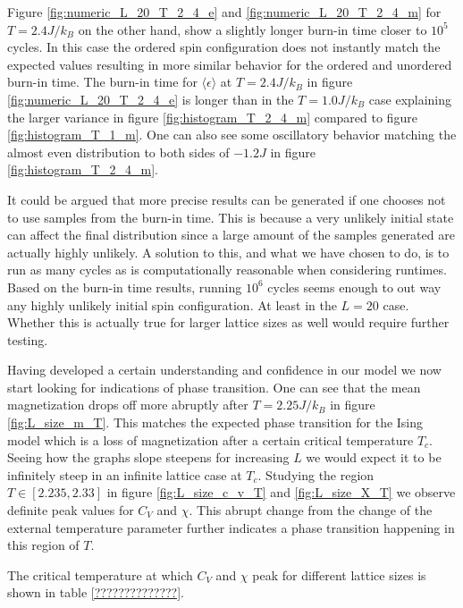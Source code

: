 \documentclass[english,notitlepage,reprint,nofootinbib]{revtex4-1}  %
\begin{document}
Figure \ref{fig:numeric_L_20_T_2_4_e} and \ref{fig:numeric_L_20_T_2_4_m} for $T=2.4 J/k_B$ on the other hand, show a slightly longer burn-in time closer to $10^5$ cycles. In this case the ordered spin configuration does not instantly match the expected values resulting in more similar behavior for the ordered and unordered burn-in time. The burn-in time for $\langle \epsilon \rangle$ at $T=2.4J/k_B$ in figure \ref{fig:numeric_L_20_T_2_4_e} is longer than in the $T=1.0 J/k_B$ case explaining the larger variance in figure \ref{fig:histogram_T_2_4_m} compared to figure \ref{fig:histogram_T_1_m}. One can also see some oscillatory behavior matching the almost even distribution to both sides of $-1.2 J$ in figure \ref{fig:histogram_T_2_4_m}.

It could be argued that more precise results can be generated if one chooses not to use samples from the burn-in time. This is because a very unlikely initial state can affect the final distribution since a large amount of the samples generated are actually highly unlikely. A solution to this, and what we have chosen to do, is to run as many cycles as is computationally reasonable when considering runtimes. Based on the burn-in time results, running $10^6$ cycles seems enough to out way any highly unlikely initial spin configuration. At least in the $L=20$ case. Whether this is actually true for larger lattice sizes as well would require further testing.

Having developed a certain understanding and confidence in our model we now start looking for indications of phase transition. One can see that the mean magnetization drops off more abruptly after $T=2.25 J/k_B$ in figure \ref{fig:L_size_m_T}. This matches the expected phase transition for the Ising model which is a loss of magnetization after a certain critical temperature $T_c$. Seeing how the graphs slope steepens for increasing $L$ we would expect it to be infinitely steep in an infinite lattice case at $T_c$. Studying the region $T \in [2.235,2.33]$ in figure \ref{fig:L_size_c_v_T} and \ref{fig:L_size_X_T} we observe definite peak values for $C_V$ and $\chi$. This abrupt change from the change of the external temperature parameter further indicates a phase transition happening in this region of $T$. 

The critical temperature at which $C_V$ and $\chi$ peak for different lattice sizes is shown in table \ref{??????????????}.
\end{document}
